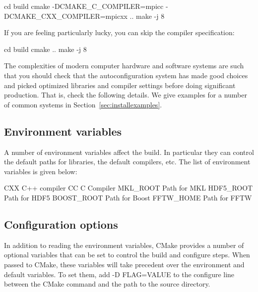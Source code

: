 \begin{shade}
cd build
cmake -DCMAKE_C_COMPILER=mpicc -DCMAKE_CXX_COMPILER=mpicxx ..
make -j 8
\end{shade}

If you are feeling particularly lucky, you can skip the compiler specification:

\begin{shade}
cd build
cmake ..
make -j 8
\end{shade}

The complexities of modern computer hardware and software systems are
such that you should check that the autoconfiguration system has made
good choices and picked optimized libraries and compiler settings
before doing significant production. That is, check the following details. We
give examples for a number of common systems in Section~\ref{sec:installexamples}.

\subsection{Environment variables}
\label{sec:envvar}
A number of environment variables affect the build.  In particular
they can control the default paths for libraries, the default
compilers, etc.  The list of environment variables is given below:
%
\begin{shade}
CXX              C++ compiler
CC               C Compiler
MKL_ROOT         Path for MKL
HDF5_ROOT        Path for HDF5
BOOST_ROOT       Path for Boost
FFTW_HOME        Path for FFTW
\end{shade}

\subsection{Configuration options}
\label{sec:cmakeoptions}
In addition to reading the environment variables, CMake provides a
number of optional variables that can be set to control the build and
configure steps.  When passed to CMake, these variables will take
precedent over the environment and default variables.  To set them,
add -D FLAG=VALUE to the configure line between the CMake command and
the path to the source directory.

